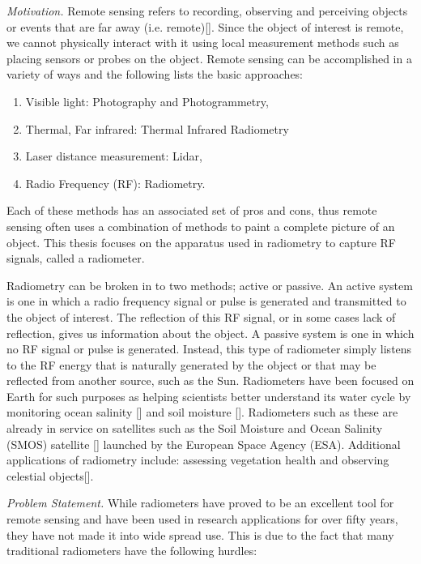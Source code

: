 \emph{Motivation.}  Remote sensing refers to recording, observing and perceiving objects or events that are far away (i.e. remote)[\cite{weng2012}].  Since the object of interest is remote, we cannot physically interact with it using local measurement methods such as placing sensors or probes on the object.  Remote sensing can be accomplished in a variety of ways and the following lists the basic approaches:

\begin{enumerate}
\item Visible light: Photography and Photogrammetry,
\item Thermal, Far infrared: Thermal Infrared Radiometry
\item Laser distance measurement: Lidar,
\item Radio Frequency (RF): Radiometry.
\end{enumerate}

Each of these methods has an associated set of pros and cons, thus remote sensing often uses a combination of methods to paint a complete picture of an object.  This thesis focuses on the apparatus used in radiometry to capture RF signals, called a radiometer.

Radiometry can be broken in to two methods; active or passive.  An active system is one in which a radio frequency signal or pulse is generated and transmitted to the object of interest.  The reflection of this RF signal, or in some cases lack of reflection, gives us information about the object.  A passive system is one in which no RF signal or pulse is generated.  Instead, this type of radiometer simply listens to the RF energy that is naturally generated by the object or that may be reflected from another source, such as the Sun.  Radiometers have been focused on Earth for such purposes as helping scientists better understand its water cycle by monitoring ocean salinity [\cite{Hardy}] and soil moisture [\cite{Liu}].  Radiometers such as these are already in service on satellites such as the Soil Moisture and Ocean Salinity (SMOS) satellite [\cite{McMullan}] launched by the European Space Agency (ESA).  Additional applications of radiometry include: assessing vegetation health and observing celestial objects[\cite{ulaby2014}].

\emph{Problem Statement.}  While radiometers have proved to be an excellent tool for remote sensing and have been used in research applications for over fifty years, they have not made it into wide spread use.  This is due to the fact that many traditional radiometers have the following hurdles:

